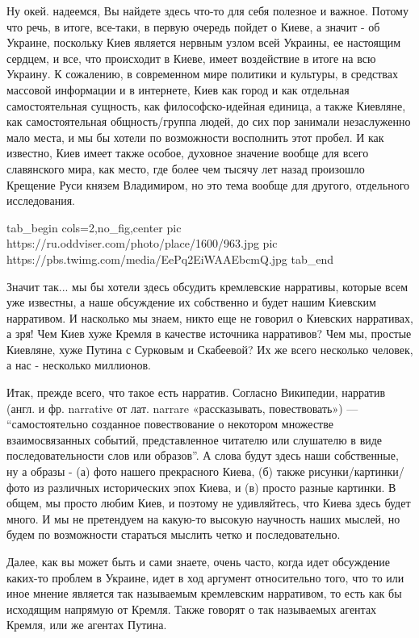 Ну окей. надеемся, Вы найдете здесь что-то для себя полезное и важное.
Потому что речь, в итоге, все-таки, в первую очередь пойдет о Киеве, а значит -
об Украине, поскольку Киев является нервным узлом всей Украины, ее настоящим
сердцем, и все, что происходит в Киеве, имеет воздействие в итоге на всю
Украину. К сожалению, в современном мире политики и культуры, в средствах
массовой информации и в интернете, Киев как город и как отдельная
самостоятельная сущность, как философско-идейная единица, а также Киевляне, как
самостоятельная общность/группа людей, до сих пор занимали незаслуженно мало
места, и мы бы хотели по возможности восполнить этот пробел. И как известно,
Киев имеет также особое, духовное значение вообще для всего славянского мира,
как место, где более чем тысячу лет назад произошло Крещение Руси князем
Владимиром, но это тема вообще для другого, отдельного исследования.

\ifcmt
  tab_begin cols=2,no_fig,center
     pic https://ru.oddviser.com/photo/place/1600/963.jpg
		 pic https://pbs.twimg.com/media/EePq2EiWAAEbcmQ.jpg
  tab_end
\fi

Значит так... мы бы хотели здесь обсудить кремлевские нарративы, которые всем
уже известны, а наше обсуждение их собственно и будет нашим Киевским
нарративом.  И насколько мы знаем, никто еще не говорил о Киевских нарративах,
а зря! Чем Киев хуже Кремля в качестве источника нарративов? Чем мы, простые
Киевляне, хуже Путина с Сурковым и Скабеевой? Их же всего несколько человек, а
нас - несколько миллионов.

Итак, прежде всего, что такое есть нарратив. Согласно Википедии, нарратив
(англ. и фр. narrative от лат. narrare «рассказывать, повествовать») —
\enquote{самостоятельно созданное повествование о некотором множестве
взаимосвязанных событий, представленное читателю или слушателю в виде
последовательности слов или образов}. А слова будут здесь наши собственные, ну
а образы - (а) фото нашего прекрасного Киева, (б) также рисунки/картинки/фото
из различных исторических эпох Киева, и (в) просто разные картинки. В общем,
мы просто любим Киев, и поэтому не удивляйтесь, что Киева здесь будет много. И
мы не претендуем на какую-то высокую научность наших мыслей, но будем по
возможности стараться мыслить четко и последовательно.

Далее, как вы может быть и сами знаете, очень часто, когда идет обсуждение
каких-то проблем в Украине, идет в ход аргумент относительно того, что то или
иное мнение является так называемым кремлевским нарративом, то есть как бы
исходящим напрямую от Кремля. Также говорят о так называемых агентах Кремля,
или же агентах Путина.

